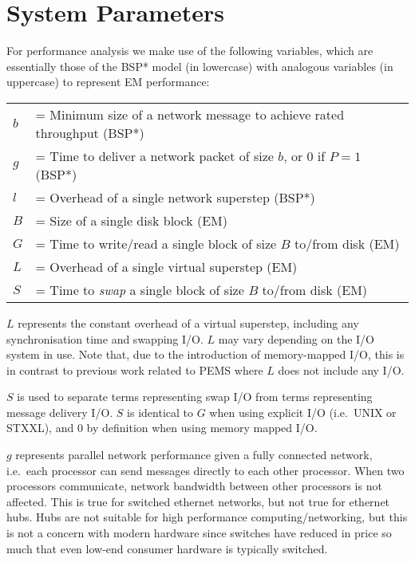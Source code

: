 \documentclass[12pt]{carletoncsthesis}
\begin{document}
\section{System Parameters}
\label{parameters}


For performance analysis we make use of the following variables,  which are
essentially those of the BSP* model (in lowercase) with analogous variables
(in uppercase) to represent EM performance:

\begin{center}
\begin{tabular}[ht]{ll}
$b$ & = Minimum size of a network message to achieve rated throughput (BSP*)\\
$g$ & = Time to deliver a network packet of size $b$, or 0 if $P=1$ (BSP*) \\
$l$ & = Overhead of a single network superstep (BSP*) \\
$B$ & = Size of a single disk block (EM) \\
$G$ & = Time to write/read a single block of size $B$ to/from disk (EM) \\
$L$ & = Overhead of a single virtual superstep (EM) \\
$S$ & = Time to {\em swap} a single block of size $B$ to/from disk (EM)
\end{tabular}
\end{center}

$L$ represents the constant overhead of a virtual superstep, including
any synchronisation time and swapping I/O.  $L$ may vary depending
on the I/O system in use.  Note that, due to the introduction of
memory-mapped I/O, this is in contrast to previous work related to PEMS
\cite{dhthesis}\cite{bspem}\cite{emsimulation}\cite{mnthesis}\cite{experimentswith}
where $L$ does not include any I/O.

$S$ is used to separate terms representing swap I/O from terms representing
message delivery I/O.  $S$ is identical to $G$ when using explicit I/O (i.e.\
UNIX or STXXL), and $0$ by definition when using memory mapped I/O.

$g$ represents parallel network performance given a fully connected
network, i.e.\ each processor can send messages directly to each other
processor.  When two processors communicate, network bandwidth between other
processors is not affected.  This is true for switched ethernet networks,
but not true for ethernet hubs.  Hubs are not suitable for high performance
computing/networking, but this is not a concern with modern hardware since
switches have reduced in price so much that even low-end consumer hardware
is typically switched.
\end{document}
